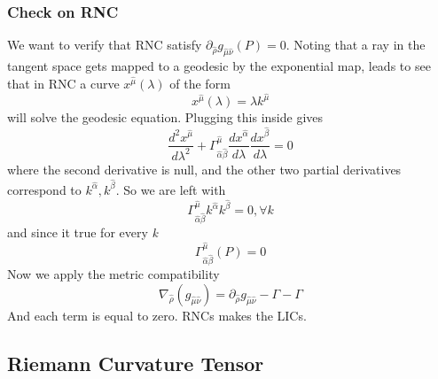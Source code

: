 \subsubsection{Check on RNC}
We want to verify that RNC satisfy $\partial_{\hat{\rho }} g_{\hat{\mu }\hat{\nu }}\left( P \right) = 0$. Noting that a ray  in the tangent space gets mapped to a geodesic by the exponential map, leads to see that in RNC a curve $x^{\hat{\mu }}\left( \lambda  \right)$ of the form
\[
x^{\hat{\mu }} \left( \lambda  \right) = \lambda k^{\hat{\mu }}
\]
will solve the geodesic equation.  Plugging this inside gives
\begin{equation}
\frac{d ^{2} x^{\hat{\mu }}}{d \lambda ^{2}} + \Gamma ^{\hat{\mu }}_{\hat{\alpha }\hat{\beta }} \frac{d x^{\hat{\alpha }}}{d \lambda }\frac{d x^{\hat{\beta }}}{d \lambda } = 0
\end{equation}
where the second derivative is null, and the other two partial derivatives correspond to $k^{\hat{\alpha }}, k^{\hat{\beta }}$. So we are left with
\begin{equation}
\Gamma ^{\hat{\mu }}_{\hat{\alpha }\hat{\beta }} k^{\hat{\alpha }}k^{\hat{\beta }} = 0, \forall k
\end{equation}
and since it true for every \emph{k}
\[
\Gamma ^{\hat{\mu }}_{\hat{\alpha }\hat{\beta }} \left( P \right) = 0
\]
Now we apply the metric compatibility
\begin{equation}
\nabla _{\hat{\rho }} \left( g_{\hat{\mu }\hat{\nu }} \right) = \partial_{\hat{\rho }} g_{\hat{\mu }\hat{\nu }} - \Gamma - \Gamma 
\end{equation}
And each term is equal to zero. RNCs makes the LICs.

\subsection{Riemann Curvature Tensor}

